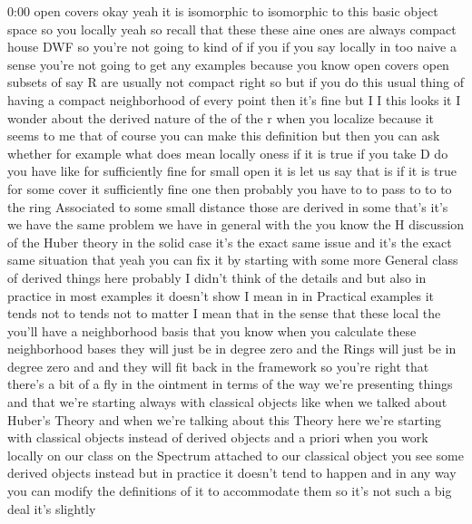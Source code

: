 \begin{unfinished}{0:00}
open  covers  okay  yeah  it  is  isomorphic
to  isomorphic
to  this  basic
object  space  so  you  locally  yeah  so
recall  that  these  these  aine  ones  are
always  compact  house  DWF  so  you're  not
going  to  kind  of  if  you  if  you  say
locally  in  too  naive  a  sense  you're  not
going  to  get  any  examples  because  you
know  open  covers  open  subsets  of  say  R
are  usually  not  compact  right  so  but  if
you  do  this  usual  thing  of  having  a
compact  neighborhood  of  every  point  then
it's  fine  but  I  I  this  looks  it  I  wonder
about  the  derived  nature  of  the  of  the  r
when  you  localize  because  it  seems  to  me
that
of  course  you  can  make  this  definition
but  then  you  can  ask  whether  for  example
what  does  mean  locally  oness  if  it  is
true  if  you  take  D  do  you  have  like  for
sufficiently  fine  for  small  open  it  is
let  us  say  that  is  if  it  is  true  for
some  cover  it  sufficiently  fine  one  then
probably  you  have  to  to  pass  to  to  to
the  ring  Associated  to  some  small
distance  those  are  derived  in  some
that's  it's  we  have  the  same  problem  we
have  in  general  with  the  you  know  the  H
discussion  of  the  Huber  theory  in  the
solid  case  it's  the  exact  same  issue  and
it's  the  exact  same  situation  that  yeah
you  can  fix  it  by  starting  with  some
more  General  class  of  derived  things
here  probably  I  didn't  think  of  the
details  and  but  also  in  practice  in  most
examples  it  doesn't  show  I  mean  in  in
Practical  examples  it  tends  not  to  tends
not  to  matter  I  mean  that  in  the  sense
that  these  local  the  you'll  have  a
neighborhood  basis  that  you  know  when
you  calculate  these  neighborhood  bases
they  will  just  be  in  degree  zero  and  the
Rings  will  just  be  in  degree  zero
and  and  they  will  fit  back  in  the
framework  so  you're  right  that  there's  a
bit  of  a  fly  in  the  ointment  in  terms  of
the  way  we're  presenting  things  and  that
we're  starting  always  with  classical
objects  like  when  we  talked  about
Huber's
Theory  and  when  we're  talking  about  this
Theory  here  we're  starting  with
classical  objects  instead  of  derived
objects  and  a  priori  when  you  work
locally  on  our  class  on  the  Spectrum
attached  to  our  classical  object  you  see
some  derived  objects  instead  but  in
practice  it  doesn't  tend  to  happen  and
in  any  way  you  can  modify  the
definitions  of  it  to  accommodate  them  so
it's  not  such  a  big  deal  it's  slightly

\end{unfinished}
